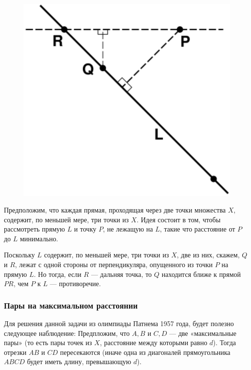 \begin{figure}[h!]
\centering
\includegraphics[scale=0.7]{Figs/Geometry/kelly}
\end{figure}

Предположим, что каждая прямая, проходящая через две точки множества $X$, содержит, по меньшей мере, три точки из $X$.
Идея состоит в том, чтобы рассмотреть прямую $L$ и точку $P$, не лежащую на $L$, такие что расстояние от $P$ до $L$ минимально.

Поскольку $L$ содержит, по меньшей мере, три точки из $X$, две из них, скажем, $Q$ и $R$, лежат с одной стороны от перпендикуляра, опущенного из точки $P$ на прямую $L$.
Но тогда, если $R$ --- дальняя точка, то $Q$ находится ближе к прямой $PR$, чем $P$ к $L$ --- противоречие.\heart

\subsubsection*{Пары на максимальном расстоянии}%

Для решения данной задачи из олимпиады Патнема 1957 года, будет полезно следующее наблюдение: Предпложим, что $A,B$ и $C,D$ --- две «максимальные пары» (то есть пары точек из $X$, расстояние между которыми равно $d$).
Тогда отрезки $AB$ и $CD$ пересекаются (иначе одна из диагоналей прямоугольника $ABCD$ будет иметь длину, превышающую $d$).

